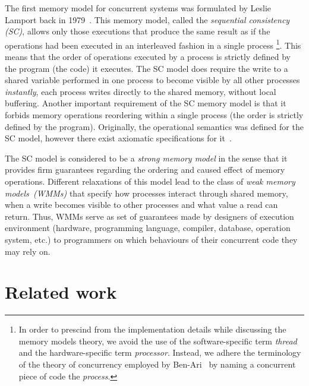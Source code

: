 The first memory model for concurrent systems was formulated by Leslie Lamport back in 1979~\cite{lamport1979make}.
This memory model, called the \textit{sequential consistency (SC)}, allows only those executions that produce the same result as if the operations had been executed in an interleaved fashion in a single process%
%
\footnote{In order to prescind from the implementation details while discussing the memory models theory, we avoid the use of the software-specific term \textit{thread} and the hardware-specific term \textit{processor}. Instead, we adhere the terminology of the theory of concurrency employed by Ben-Ari~\cite{ben2006principles} by naming a concurrent piece of code the \textit{process}.}. %
%
This means that the order of operations executed by a process is strictly defined by the program (the code) it executes.
The SC model does require the write to a shared variable performed in one process to become visible by all other processes \textit{instantly}, each process writes directly to the shared memory, without local buffering.
Another important requirement of the SC memory model is that it forbids memory operations reordering within a single process (the order is strictly defined by the program).
Originally, the operational semantics was defined for the SC model, however there exist axiomatic specifications for it~\cite{mansky2015axiomatic}.

The SC model is considered to be a \textit{strong memory model} in the sense that it provides firm guarantees regarding the ordering and caused effect of memory operations.
Different relaxations of this model lead to the class of \textit{weak memory models~(WMMs)} that specify how processes interact through shared memory, when a write becomes visible to other processes and what value a read can return.
Thus, WMMs serve as set of guarantees made by designers of execution environment (hardware, programming language, compiler, database, operation system, etc.) to programmers on which behaviours of their concurrent code they may rely on.


\section{Related work}
\label{ch:intro:related}

